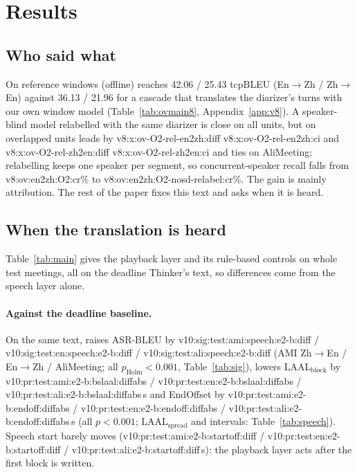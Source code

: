 \section{Results}
\label{sec:results}

\subsection{Who said what}
\label{sec:res-offline}
\label{sec:res-overlap}

On reference windows \sys{} (offline) reaches 42.06 / 25.43 tcpBLEU (En$\rightarrow$Zh / Zh$\rightarrow$En) against
36.13 / 21.96 for a cascade that translates the diarizer's turns with our own window model (Table~\ref{tab:ovmain8},
Appendix~\ref{app:v8}). A speaker-blind model relabelled with the same diarizer is close on all units, but on
overlapped units \sys{} leads by \num{v8:x:ov-O2-rel-en2zh:diff} \num{v8:x:ov-O2-rel-en2zh:ci} and
\num{v8:x:ov-O2-rel-zh2en:diff} \num{v8:x:ov-O2-rel-zh2en:ci} and ties on AliMeeting: relabelling keeps one speaker
per segment, so concurrent-speaker recall falls from \num{v8:ov:en2zh:O2:cr}\% to
\num{v8:ov:en2zh:O2-nosd-relabel:cr}\%. The gain is mainly attribution. The rest of the paper fixes this text and asks
when it is heard.

\subsection{When the translation is heard}
\label{sec:res-pa}
\label{sec:res-v10}

Table~\ref{tab:main} gives the playback layer and its rule-based controls on whole test meetings, all on the deadline
Thinker's text, so differences come from the speech layer alone.

\paragraph{Against the deadline baseline.} On the same text, \sys{} raises ASR-BLEU by
\num{v10:sig:test:ami:speech:e2-b:diff} / \num{v10:sig:test:en:speech:e2-b:diff} /
\num{v10:sig:test:ali:speech:e2-b:diff} (AMI Zh$\rightarrow$En / En$\rightarrow$Zh / AliMeeting; all
$p_\text{Holm}<0.001$, Table~\ref{tab:sig}), lowers LAAL$_\text{block}$ by
\num{v10:pr:test:ami:e2-b:bslaal:diffabs} / \num{v10:pr:test:en:e2-b:bslaal:diffabs} /
\num{v10:pr:test:ali:e2-b:bslaal:diffabs}\,s and EndOffset by \num{v10:pr:test:ami:e2-b:endoff:diffabs} /
\num{v10:pr:test:en:e2-b:endoff:diffabs} / \num{v10:pr:test:ali:e2-b:endoff:diffabs}\,s (all $p<0.001$;
LAAL$_\text{spread}$ and intervals: Table~\ref{tab:speech}). Speech start barely moves (\num{v10:pr:test:ami:e2-b:startoff:diff} /
\num{v10:pr:test:en:e2-b:startoff:diff} / \num{v10:pr:test:ali:e2-b:startoff:diff}\,s): the playback layer acts after
the first block is written.

